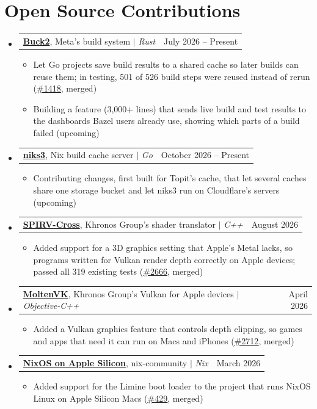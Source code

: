 \documentclass[letterpaper,11pt]{article}
\makeatletter
\newcommand{\resumeItem}[1]{
  \item\small{
    {#1 \vspace{-2pt}}
  }
}
\newcommand{\resumeProjectHeading}[2]{
    \item
    \begin{tabular*}{0.97\textwidth}{l@{\extracolsep{\fill}}r}
      \small#1 & #2 \\
    \end{tabular*}\vspace{-7pt}
}
\newcommand{\resumeSubHeadingListStart}{\begin{itemize}[leftmargin=0.15in, label={}]}
\newcommand{\resumeSubHeadingListEnd}{\end{itemize}}
\newcommand{\resumeItemListStart}{\begin{itemize}}
\newcommand{\resumeItemListEnd}{\end{itemize}\vspace{-5pt}}
\makeatother
\begin{document}
\section{Open Source Contributions}
    \resumeSubHeadingListStart
      \resumeProjectHeading
          {\textbf{\href{https://github.com/facebook/buck2}{Buck2}}, Meta's build system $|$ \emph{Rust}}{July 2026 -- Present}
          \resumeItemListStart
            \resumeItem{Let Go projects save build results to a shared cache so later builds can reuse them; in testing, 501 of 526 build steps were reused instead of rerun (\href{https://github.com/facebook/buck2/pull/1418}{\underline{\#1418}}, merged)}
            \resumeItem{Building a feature (3,000+ lines) that sends live build and test results to the dashboards Bazel users already use, showing which parts of a build failed (upcoming)}
          \resumeItemListEnd
      \resumeProjectHeading
          {\textbf{\href{https://github.com/Mic92/niks3}{niks3}}, Nix build cache server $|$ \emph{Go}}{October 2026 -- Present}
          \resumeItemListStart
            \resumeItem{Contributing changes, first built for Topit's cache, that let several caches share one storage bucket and let niks3 run on Cloudflare's servers (upcoming)}
          \resumeItemListEnd
      \resumeProjectHeading
          {\textbf{\href{https://github.com/KhronosGroup/SPIRV-Cross}{SPIRV-Cross}}, Khronos Group's shader translator $|$ \emph{C++}}{August 2026}
          \resumeItemListStart
            \resumeItem{Added support for a 3D graphics setting that Apple's Metal lacks, so programs written for Vulkan render depth correctly on Apple devices; passed all 319 existing tests (\href{https://github.com/KhronosGroup/SPIRV-Cross/pull/2666}{\underline{\#2666}}, merged)}
          \resumeItemListEnd
      \resumeProjectHeading
          {\textbf{\href{https://github.com/KhronosGroup/MoltenVK}{MoltenVK}}, Khronos Group's Vulkan for Apple devices $|$ \emph{Objective-C++}}{April 2026}
          \resumeItemListStart
            \resumeItem{Added a Vulkan graphics feature that controls depth clipping, so games and apps that need it can run on Macs and iPhones (\href{https://github.com/KhronosGroup/MoltenVK/pull/2712}{\underline{\#2712}}, merged)}
          \resumeItemListEnd
      \resumeProjectHeading
          {\textbf{\href{https://github.com/nix-community/nixos-apple-silicon}{NixOS on Apple Silicon}}, nix-community $|$ \emph{Nix}}{March 2026}
          \resumeItemListStart
            \resumeItem{Added support for the Limine boot loader to the project that runs NixOS Linux on Apple Silicon Macs (\href{https://github.com/nix-community/nixos-apple-silicon/pull/429}{\underline{\#429}}, merged)}
          \resumeItemListEnd
    \resumeSubHeadingListEnd
\end{document}
